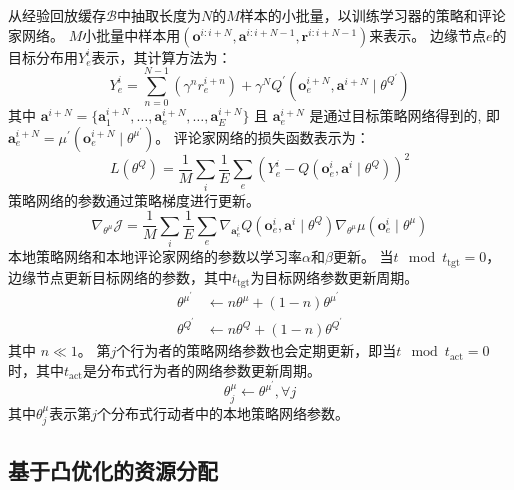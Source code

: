 从经验回放缓存$\mathcal{B}$中抽取长度为$N$的$M$样本的小批量，以训练学习器的策略和评论家网络。
$M$小批量中样本用$\left(\boldsymbol{o}^{i:i+N}, \boldsymbol{a}^{i:i+N-1}, \boldsymbol{r}^{i:i+N-1}\right)$来表示。
边缘节点$e$的目标分布用$Y_e^i$表示，其计算方法为：
\begin{equation}
	Y_e^{i} = \sum_{n=0}^{N-1} \left( \gamma^{n} r_{e}^{i+n}\right)+\gamma^{N} Q^{\prime}\left(\boldsymbol{o}_{e}^{i+N}, \boldsymbol{a}^{i+N} \mid \theta^{Q^{\prime}} \right)
\end{equation}
\noindent 其中 $\boldsymbol{a}^{i+N} = \{ \boldsymbol{a}_{1}^{i+N}, \ldots, \boldsymbol{a}_{e}^{i+N}, \ldots, \boldsymbol{a}_{E}^{i+N} \}$ 且 $\boldsymbol{a}_{e}^{i+N}$ 是通过目标策略网络得到的, 即$\boldsymbol{a}_{e}^{i+N} = \mu^{\prime}(\boldsymbol{o}_{e}^{i+N} \mid \theta^{\mu^{\prime}})$。
评论家网络的损失函数表示为：
\begin{equation}
	{L}\left(\theta^{Q}\right)=\frac{1}{M} \sum_{i} \frac{1}{E} \sum_{e} \left(Y_e^{i}-Q\left(\boldsymbol{o}_{e}^{i}, \boldsymbol{a}^{i} \mid \theta^{Q}\right)\right)^{2}
\end{equation}
策略网络的参数通过策略梯度进行更新。
\begin{equation}
	\nabla_{\theta^{\mu}} \mathcal{J} = \frac{1}{M} \sum_{i} \frac{1}{E} \sum_{e} \nabla_{\boldsymbol{a}_{e}^{i}} Q\left(\boldsymbol{o}_{e}^{i}, \boldsymbol{a}^{i} \mid \theta^{Q}\right) \nabla_{\theta^{\mu}} \mu\left(\boldsymbol{o}_{e}^{i} \mid \theta^{\mu}\right)
\end{equation}
本地策略网络和本地评论家网络的参数以学习率$\alpha$和$\beta$更新。
当$t\mod t_{\operatorname{tgt}}=0$，边缘节点更新目标网络的参数，其中$t_{\operatorname{tgt}}$为目标网络参数更新周期。
\begin{align}
	\theta^{\mu^{\prime}} &\leftarrow n \theta^{\mu}+(1-n)  \theta^{\mu^{\prime}}\\
	\theta^{Q^{\prime}} &\leftarrow n  \theta^{Q}+(1-n) \theta^{Q^{\prime}}
\end{align}
\noindent 其中 $n \ll 1$。
第$j$个行为者的策略网络参数也会定期更新，即当$t \mod t_{\operatorname{act}} = 0$时，其中$t_{\operatorname{act}}$是分布式行为者的网络参数更新周期。
\begin{equation}
	\theta_{j}^{\mu} \leftarrow \theta^{\mu^{\prime}}, \forall j
\end{equation}
其中$\theta_{j}^{\mu}$表示第$j$个分布式行动者中的本地策略网络参数。
	
\subsection[\hspace{-2pt}基于凸优化的资源分配]{{ \hspace{-8pt}基于凸优化的资源分配}}

